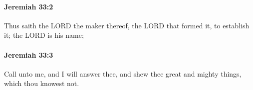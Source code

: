 		\paragraph{Jeremiah 33:2} %
			\label{JEREMIAH-33-2}

			Thus saith the LORD the maker thereof, the LORD that formed it, to establish it; the LORD is his name;


		\paragraph{Jeremiah 33:3} %
			\label{JEREMIAH-33-3}

			Call unto me, and I will answer thee, and shew thee great and mighty things, which thou knowest not.


